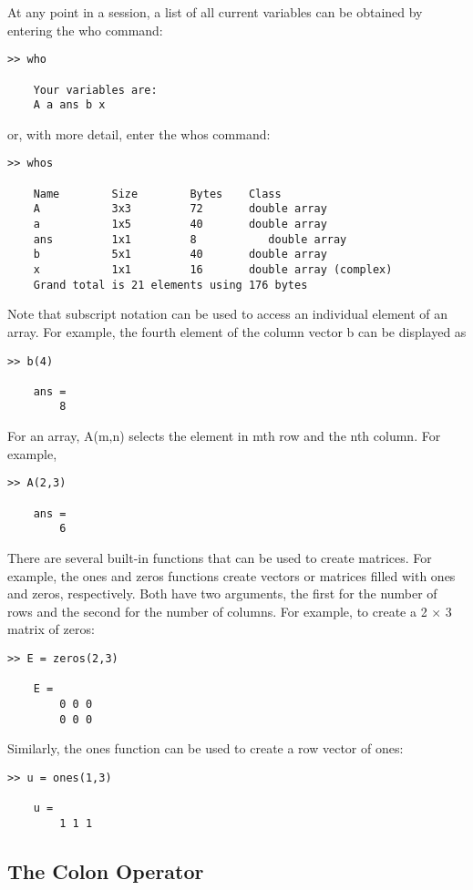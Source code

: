 \documentclass[../main.tex]{subfiles}
\begin{document}
At any point in a session, a list of all current variables can be obtained by entering the
who command:
\begin{lstlisting}[frame=none, numbers=none]
	>> who

	Your variables are:
	A a ans b x
\end{lstlisting}
or, with more detail, enter the whos command:
\begin{lstlisting}[frame=none, numbers=none]
	>> whos

	Name		Size 		Bytes	 Class
	A 			3x3 		72		 double array
	a 			1x5 		40		 double array
	ans 		1x1 		8		 	double array
	b 			5x1 		40		 double array
	x 			1x1 		16		 double array (complex)
	Grand total is 21 elements using 176 bytes
\end{lstlisting}
Note that subscript notation can be used to access an individual element of an array.
For example, the fourth element of the column vector b can be displayed as
\begin{lstlisting}[frame=none, numbers=none]
	>> b(4)

	ans =
		8
\end{lstlisting}
For an array, A(m,n) selects the element in mth row and the nth column. For example,
\begin{lstlisting}[frame=none, numbers=none]
	>> A(2,3)

	ans =
		6
\end{lstlisting}
There are several built-in functions that can be used to create matrices. For example,
the ones and zeros functions create vectors or matrices filled with ones and zeros,
respectively. Both have two arguments, the first for the number of rows and the second for
the number of columns. For example, to create a 2 × 3 matrix of zeros:
\begin{lstlisting}[frame=none, numbers=none]
	>> E = zeros(2,3)

	E =
		0 0 0
		0 0 0
\end{lstlisting}
Similarly, the ones function can be used to create a row vector of ones:
\begin{lstlisting}[frame=none, numbers=none]
	>> u = ones(1,3)

	u =
		1 1 1
\end{lstlisting}

\subsection{The Colon Operator}\
\end{document}
